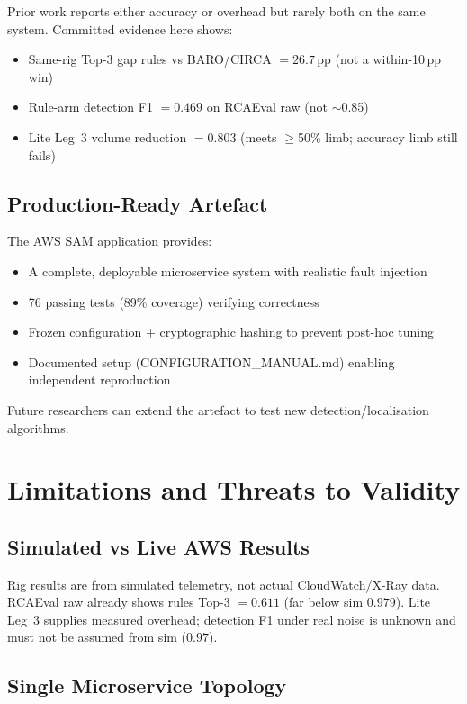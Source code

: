 Prior work reports either accuracy or overhead but rarely both on the same system. Committed evidence here shows:
\begin{itemize}
    \item Same-rig Top-3 gap rules vs BARO/CIRCA $=26.7$\,pp (not a within-10\,pp win)
    \item Rule-arm detection F1 $=0.469$ on RCAEval raw (not $\sim$0.85)
    \item Lite Leg~3 volume reduction $=0.803$ (meets $\geq$50\% limb; accuracy limb still fails)
\end{itemize}

\subsection{Production-Ready Artefact}

The AWS SAM application provides:
\begin{itemize}
    \item A complete, deployable microservice system with realistic fault injection
    \item 76 passing tests (89\% coverage) verifying correctness
    \item Frozen configuration + cryptographic hashing to prevent post-hoc tuning
    \item Documented setup (CONFIGURATION\_MANUAL.md) enabling independent reproduction
\end{itemize}

Future researchers can extend the artefact to test new detection/localisation algorithms.

\section{Limitations and Threats to Validity}

\subsection{Simulated vs Live AWS Results}

Rig results are from simulated telemetry, not actual CloudWatch/X-Ray data. RCAEval raw already shows rules Top-3 $=0.611$ (far below sim $0.979$). Lite Leg~3 supplies measured overhead; detection F1 under real noise is unknown and must not be assumed from sim ($0.97$).

\subsection{Single Microservice Topology}

